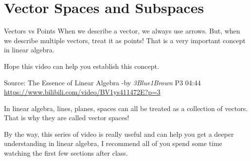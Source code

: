 \documentclass{beamer}
\begin{document}
\section{Vector Spaces and Subspaces}
\begin{frame}{Vectors vs Points}
When we describe a vector, we always use arrows. But, when we describe multiple vectors, treat it as points! That is a very important concept in linear algebra.

\vspace{3pt}
Hope this video can help you establish this concept.

\vspace{8pt}

Source: The Essence of Linear Algebra -by \emph{3Blue1Brown} P3 04:44\\
\vspace{3pt}
\url{https://www.bilibili.com/video/BV1ys411472E?p=3}

\vspace{8pt}

In linear algebra, lines, planes, spaces can all be treated as a collection of vectors. That is why they are called vector spaces!

\vspace{3pt}
By the way, this series of video is really useful and can help you get a deeper understanding in linear algebra, I recommend all of you spend some time watching the first few sections after class.

\end{frame}
\end{document}
